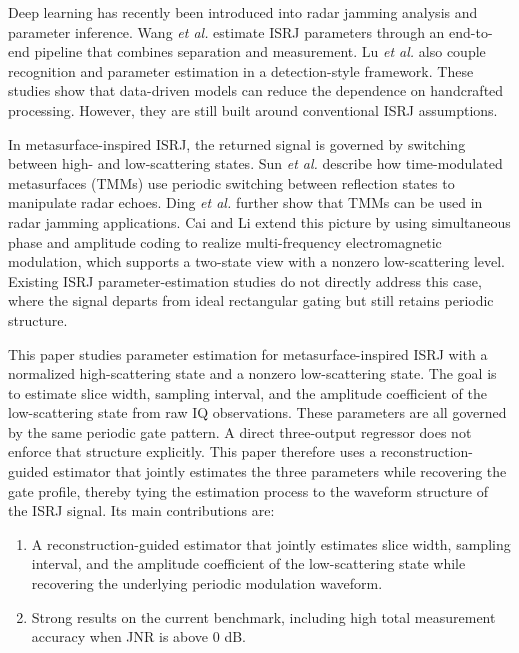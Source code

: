 \documentclass[conference]{IEEEtran}
\begin{document}
Deep learning has recently been introduced into radar jamming analysis and parameter inference. Wang \emph{et al.} \cite{wang2026ast} estimate ISRJ parameters through an end-to-end pipeline that combines separation and measurement. Lu \emph{et al.} \cite{lu2025rs} also couple recognition and parameter estimation in a detection-style framework. These studies show that data-driven models can reduce the dependence on handcrafted processing. However, they are still built around conventional ISRJ assumptions.

In metasurface-inspired ISRJ, the returned signal is governed by switching between high- and low-scattering states. Sun \emph{et al.} \cite{sun2024tmtt} describe how time-modulated metasurfaces (TMMs) use periodic switching between reflection states to manipulate radar echoes. Ding \emph{et al.} \cite{ding2025tmtt} further show that TMMs can be used in radar jamming applications. Cai and Li \cite{cai2024} extend this picture by using simultaneous phase and amplitude coding to realize multi-frequency electromagnetic modulation, which supports a two-state view with a nonzero low-scattering level. Existing ISRJ parameter-estimation studies do not directly address this case, where the signal departs from ideal rectangular gating but still retains periodic structure.

This paper studies parameter estimation for metasurface-inspired ISRJ with a normalized high-scattering state and a nonzero low-scattering state. The goal is to estimate slice width, sampling interval, and the amplitude coefficient of the low-scattering state from raw IQ observations. These parameters are all governed by the same periodic gate pattern. A direct three-output regressor does not enforce that structure explicitly. This paper therefore uses a reconstruction-guided estimator that jointly estimates the three parameters while recovering the gate profile, thereby tying the estimation process to the waveform structure of the ISRJ signal. Its main contributions are:
\begin{enumerate}
\item A reconstruction-guided estimator that jointly estimates slice width, sampling interval, and the amplitude coefficient of the low-scattering state while recovering the underlying periodic modulation waveform.
\item Strong results on the current benchmark, including high total measurement accuracy when JNR is above $0$ dB.
\end{enumerate}
\end{document}
